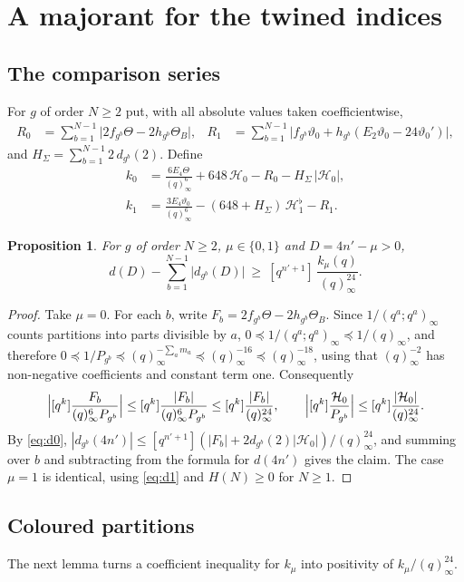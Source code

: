\documentclass[11pt]{amsart}
\newtheorem{proposition}[theorem]{Proposition}
\theoremstyle{definition}
\newcommand{\vt}{\vartheta}
\newcommand{\cH}{\mathcal H}
\begin{document}
\section{A majorant for the twined indices}\label{sec:majorant}

\subsection{The comparison series}
For $g$ of order $N\ge2$ put, with all absolute values taken coefficientwise,
\begin{align}
R_0&=\sum_{b=1}^{N-1}\bigl|2f_{g^b}\Theta-2h_{g^b}\Theta_B\bigr|,&
R_1&=\sum_{b=1}^{N-1}\bigl|f_{g^b}\vt_0+h_{g^b}(E_2\vt_0-24\vt_0')\bigr|,\label{eq:R}
\end{align}
and $H_\Sigma=\sum_{b=1}^{N-1}2\,d_{g^b}(2)$. Define
\begin{align}
k_0&=\frac{6E_4\Theta}{(q)_\infty^6}+648\,\cH_0-R_0-H_\Sigma\,|\cH_0|,\label{eq:k0}\\
k_1&=\frac{3E_4\vt_0}{(q)_\infty^6}-(648+H_\Sigma)\,\cH_1^\flat-R_1.\label{eq:k1}
\end{align}

\begin{proposition}\label{prop:majorant}
For $g$ of order $N\ge2$, $\mu\in\{0,1\}$ and $D=4n'-\mu>0$,
\[
d(D)-\sum_{b=1}^{N-1}\bigl|d_{g^b}(D)\bigr|\ \ge\ [q^{n'+1}]\,\frac{k_\mu(q)}{(q)_\infty^{24}}.
\]
\end{proposition}

\begin{proof}
Take $\mu=0$. For each $b$, write $F_b=2f_{g^b}\Theta-2h_{g^b}\Theta_B$. Since $1/(q^a;q^a)_\infty$ counts partitions into parts divisible by $a$, $0\preceq 1/(q^a;q^a)_\infty\preceq1/(q)_\infty$, and therefore $0\preceq1/P_{g^b}\preceq(q)_\infty^{-\sum_am_a}\preceq(q)_\infty^{-16}\preceq(q)_\infty^{-18}$, using that $(q)_\infty^{-2}$ has non-negative coefficients and constant term one. Consequently
\[
\Bigl|[q^k]\frac{F_b}{(q)_\infty^6P_{g^b}}\Bigr|\le[q^k]\frac{|F_b|}{(q)_\infty^6P_{g^b}}\le[q^k]\frac{|F_b|}{(q)_\infty^{24}},\qquad
\Bigl|[q^k]\frac{\cH_0}{P_{g^b}}\Bigr|\le[q^k]\frac{|\cH_0|}{(q)_\infty^{24}} .
\]
By \eqref{eq:d0}, $|d_{g^b}(4n')|\le[q^{n'+1}](|F_b|+2d_{g^b}(2)|\cH_0|)/(q)_\infty^{24}$, and summing over $b$ and subtracting from the formula for $d(4n')$ gives the claim. The case $\mu=1$ is identical, using \eqref{eq:d1} and $H(N)\ge0$ for $N\ge1$.
\end{proof}

\subsection{Coloured partitions}
The next lemma turns a coefficient inequality for $k_\mu$ into positivity of $k_\mu/(q)_\infty^{24}$.
\end{document}
